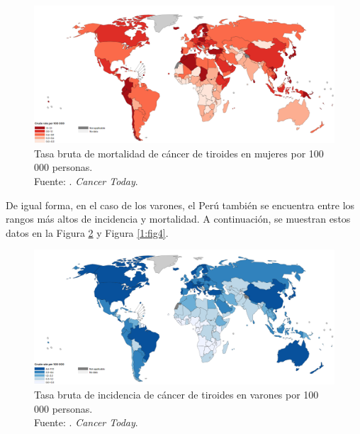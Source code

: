 \begin{figure}[H]
	\begin{center}
		\includegraphics[width=1.00 \textwidth]{1/figures/tb_mor_ct_mujeres.png}
		\caption[Tasa bruta de mortalidad de cáncer de tiroides en mujeres por 100 000 personas]{Tasa bruta de mortalidad de cáncer de tiroides en mujeres por 100 000 personas. \\
		Fuente: \cite{ws_oms2022cancert}. \textit{Cancer Today}.}
		\label{1:fig2}
	\end{center}
\end{figure}

De igual forma, en el caso de los varones, el Perú también se encuentra entre los rangos más altos de incidencia y mortalidad. A continuación, se muestran estos datos en la Figura \ref{1:fig3} y Figura \ref{1:fig4}.

\begin{figure}[H]
	\begin{center}
		\includegraphics[width=1.00 \textwidth]{1/figures/tb_inc_ct_varones.png}
		\caption[Tasa bruta de incidencia de cáncer de tiroides en varones por 100 000 personas]{Tasa bruta de incidencia de cáncer de tiroides en varones por 100 000 personas. \\
		Fuente: \cite{ws_oms2022cancert}. \textit{Cancer Today}.}
		\label{1:fig3}
	\end{center}
\end{figure}

